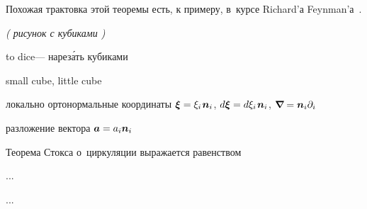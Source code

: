 \begin{otherlanguage}{russian}
Похожая трактовка этой теоремы есть, к примеру, в~курсе Richard’а Feynman’а~\cite{feynman-lecturesonphysics}.

\emph{( рисунок с кубиками )}

to dice\:--- нарез\'{а}ть кубиками

small cube, little cube

локально ортонормальные координаты ${\bm{\xi} = \xi_i \hspace{.2ex} \bm{n}_i \hspace{.1ex}}$, ${d\bm{\xi} = d \xi_i \hspace{.2ex} \bm{n}_i}$, ${\bm{\nabla}\hspace{-0.2ex} = \bm{n}_i \partial_i}$

разложение вектора ${\bm{a} = a_i \bm{n}_i \hspace{.1ex}}$

Теорема Стокса о~циркуляции выражается равенством

...

\newpage ...



\end{otherlanguage}



\newpage



\label{para:curvaturetensors}

